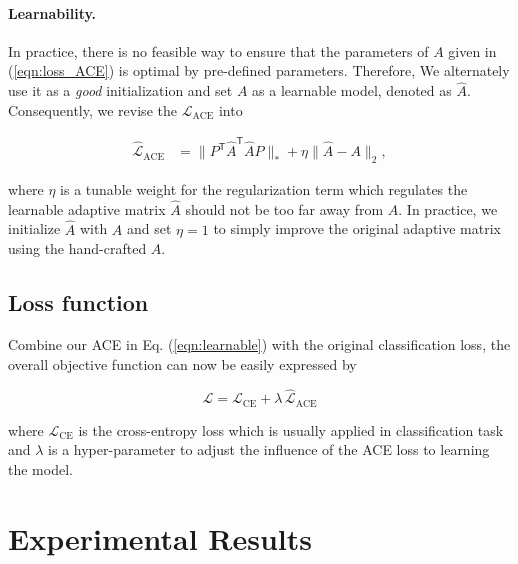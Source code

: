 \documentclass{article}
\newcommand{\cL}{{\mathcal{L}}}
\begin{document}
\paragraph{Learnability.} In practice, there is no feasible way to ensure that the parameters of $A$ given in (\ref{eqn:loss_ACE}) is optimal by pre-defined parameters. Therefore, We alternately use it as a {\em good} initialization and set $A$ as a learnable model, denoted as $\hat{A}$. Consequently,  we revise the $\cL_\mathrm{ACE}$ into
\begin{linenomath}
\begin{align}
    \hat{\cL}_\mathrm{ACE} & = \| P^\mathsf{T} \hat{A}^\mathsf{T} \hat{A} P \|_* + \eta \| \hat{A} - A \|_2,
    \label{eqn:learnable}
\end{align}
\end{linenomath}
where $\eta$ is a tunable weight for the regularization term which regulates the learnable adaptive matrix $\hat{A}$ should not be too far away from $A$. In practice, we initialize $\hat{A}$ with $A$ and set $\eta = 1$ to simply improve the original adaptive matrix using the hand-crafted $A$.

\subsection{Loss function}


Combine our ACE in Eq. (\ref{eqn:learnable}) with the original classification loss, the overall objective function can now be easily expressed by
\begin{linenomath}
\begin{equation}
    \cL= \cL_{\mathrm{CE}} + \lambda \, \hat{\cL}_\mathrm{ACE}
    \label{eqn:loss_all}
\end{equation}
\end{linenomath}
\noindent where $\cL_\mathrm{CE}$ is the cross-entropy loss which is usually applied in classification task and $\lambda$ is a hyper-parameter to adjust the influence of the ACE loss to learning the model.

\section{Experimental Results}
\label{sec:result}
\end{document}
